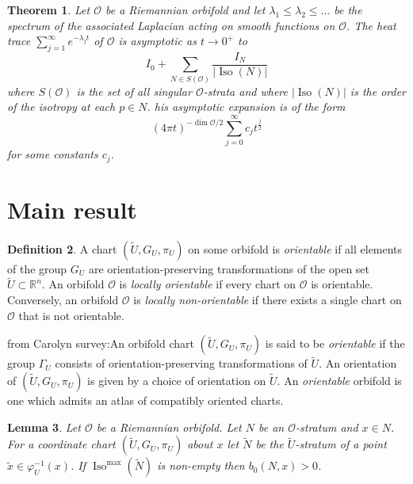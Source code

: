 \documentclass{amsart}
\theoremstyle{plain}
\newtheorem{thm}{Theorem}[section]
\newtheorem{lemma}[thm]{Lemma}
\theoremstyle{definition}
\newtheorem{definition}[thm]{Definition}
\theoremstyle{remark}
\newcommand{\myabs}[1]{\vert#1\vert}
\newcommand{\wtu}{\widetilde{U}}
\newcommand{\orb}{\mathcal O}
\newcommand{\cc}{(\widetilde{U}, G_U, \pi_U)}
\DeclareMathOperator{\iso}{Iso}
\begin{document}
\begin{thm}\cite[Theorem 4.8]{dggw} \label{hta} Let $\orb$ be a Riemannian orbifold and let $\lambda_1 \le \lambda_2 \le \dots $ be the spectrum of the associated Laplacian acting on smooth functions on $\orb$. The heat trace $\sum_{j=1}^{\infty}e^{-\lambda_{j} t}$ of $\orb$ is asymptotic as $t \rightarrow 0^+$ to
\[I_0+\sum_{N \in S(\mathcal{O})}\frac{I_N}{\myabs{\iso(N)}}\]
where $S(\orb)$ is the set of all singular $\orb$-strata and where
$\myabs{\iso(N)}$ is the order of the isotropy at each $p \in N$.
 his asymptotic expansion is of the form 
\[(4\pi t)^{-\dim{\orb}/2} \sum_{j=0}^\infty c_j t^{\tfrac{j}{2}}\]
for some constants $c_j$.
\end{thm}


\section{Main result}

\begin{definition}
    A chart $(\tilde{U},G_U,\pi_U)$ on some orbifold is \emph{orientable} if all elements of the group $G_U$ are orientation-preserving transformations of the open set $\tilde{U} \subset \mathbb{R}^n$. An orbifold $\mathcal{O}$ is \emph{locally orientable} if every chart on $\mathcal{O}$ is orientable. Conversely, an orbifold $\mathcal{O}$ is \emph{locally non-orientable} if there exists a single chart on $\mathcal{O}$ that is not orientable.
    
    from Carolyn survey:An orbifold chart $\cc$ is said to be \emph{orientable} if the group $\Gamma_U$ consists of orientation-preserving transformations of $\wtu$.  An orientation of $\cc$ is given by a choice of orientation on $\wtu$. An \emph{orientable} orbifold is one which admits an atlas of compatibly oriented charts.
\end{definition}

\begin{lemma}\label{lem:b_0} Let $\orb$ be a Riemannian orbifold. Let $N$ be an $\orb$-stratum and $x\in N$. For a coordinate chart $(\widetilde{U}, G_U, \pi_U)$ about $x$ let $\widetilde{N}$ be the $\wtu$-stratum of a point $\tilde{x}\in \varphi_U^{-1}(x)$.  If $\iso^{\max}(\widetilde N)$ is non-empty then $b_0(N,x) > 0$.
\end{lemma}
\end{document}
